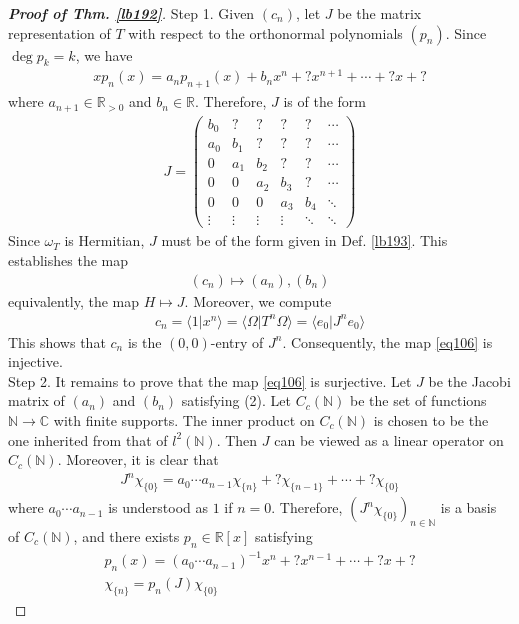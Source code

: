 \documentclass[12pt,b5paper,notitlepage]{article}
\theoremstyle{definition}
\theoremstyle{plain}
\newcommand{\bk}[1]{\langle {#1}\rangle}
\newcommand{\Cbb}{\mathbb C}
\newcommand{\Nbb}{\mathbb N}
\newcommand{\Rbb}{\mathbb R}
\numberwithin{equation}{section}
\begin{document}
\begin{proof}[\textbf{Proof of Thm. \ref{lb192}}]
Step 1. Given $(c_n)$, let $J$ be the matrix representation of $T$ with respect to the orthonormal polynomials $(p_n)$. Since $\deg p_k=k$, we have
\begin{align}
xp_n(x)=a_np_{n+1}(x)+ b_n x^n+? x^{n+1}+\cdots+? x+?
\end{align}
where $a_{n+1}\in\Rbb_{>0}$ and $b_n\in\Rbb$. Therefore, $J$ is of the form
\begin{align*}
J=\begin{pmatrix}
b_0&?&?&?&?&\cdots\\
a_0&b_1&?&?&?&\cdots\\
0&a_1&b_2&?&?&\cdots\\
0&0&a_2&b_3&?&\cdots\\
0&0&0&a_3&b_4&\ddots\\
\vdots&\vdots&\vdots&\vdots&\ddots&\ddots
\end{pmatrix}
\end{align*}
Since $\omega_T$ is Hermitian, $J$ must be of the form given in Def. \ref{lb193}. This establishes the map
\begin{align}\label{eq106}
(c_n)\mapsto (a_n),(b_n)
\end{align}
equivalently, the map $H\mapsto J$. Moreover, we compute
\begin{align*}
c_n=\bk{1|x^n}=\bk{\Omega|T^n\Omega}=\bk{e_0|J^n e_0}
\end{align*}
This shows that $c_n$ is the $(0,0)$-entry of $J^n$. Consequently, the map \eqref{eq106} is injective.\\[-1ex]

Step 2. It remains to prove that the map \eqref{eq106} is surjective. Let $J$ be the Jacobi matrix of $(a_n)$ and $(b_n)$ satisfying (2). Let $C_c(\Nbb)$ be the set of functions $\Nbb\rightarrow\Cbb$ with finite supports. The inner product on $C_c(\Nbb)$ is chosen to be the one inherited from that of $l^2(\Nbb)$. Then $J$ can be viewed as a linear operator on $C_c(\Nbb)$. Moreover, it is clear that
\begin{align*}
J^n\chi_{\{0\}}=a_0\cdots a_{n-1} \chi_{\{n\}}+?\chi_{\{n-1\}}+\cdots+?\chi_{\{0\}}
\end{align*}
where $a_0\cdots a_{n-1}$ is understood as $1$ if $n=0$. Therefore, $(J^n\chi_{\{0\}})_{n\in\Nbb}$ is a basis of $C_c(\Nbb)$, and there exists $p_n\in\Rbb[x]$ satisfying
\begin{subequations}\label{eq108}
\begin{gather}
p_n(x)=(a_0\cdots a_{n-1})^{-1}x^n+?x^{n-1}+\cdots+?x+?\label{eq108a}\\
\chi_{\{n\}}=p_n(J)\chi_{\{0\}}\label{eq108b}
\end{gather}
\end{subequations}



\end{proof}
\end{document}
